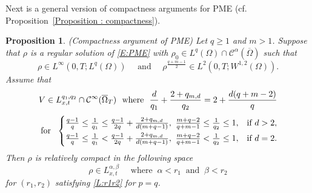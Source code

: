 \documentclass{amsart}
\newtheorem{proposition}[defn]{Proposition}
\numberwithin{equation}{section}
\newcommand{\calC}{{ \mathcal C  }}
\begin{document}
%
Next is a general version of compactness arguments for PME (cf. Proposition~\ref{Proposition : compactness}).
\begin{proposition}\label{P:AL:PME} (Compactness argument of PME)
 Let $q\geq 1$ and $m>1$.
Suppose that $\rho$ is a regular solution of \eqref{E:PME} with $\rho_{0}\in  L^{q}(\Omega) \cap \calC^{\alpha}(\overline{\Omega})$ such that 
\begin{equation*}\label{FS01:PME}
\rho \in L^{\infty} \left(0, T; L^q (\Omega)\right) \quad \text{ and } \quad 
\rho^{\frac{q+m-1}{2}} \in L^2 \left(0, T; W^{1,2}(\Omega)\right).
\end{equation*}
Assume that 
\begin{equation}\label{V:compact:PME}
\begin{gathered}
	V \in L_{x,t}^{q_1, q_2}\cap \calC^{\infty} (\overline{\Omega}_{T})
	\ \text{ where } \  \frac{d}{q_1} + \frac{2 + q_{m,d}}{q_2} = 2+\frac{d(q+m-2)}{q} \vspace{1 mm}\\
	\text{ for } \ 
	\begin{cases}
		\frac{q-1}{q}\leq \frac{1}{q_1} \leq \frac{q-1}{2q} + \frac{2+q_{m,d}}{d(m+q-1)}, \ \frac{m+q-2}{q+m-1} \leq \frac{1}{q_2} \leq 1, & \text{if } d > 2, \vspace{1 mm}\\
		\frac{q-1}{q} \leq \frac{1}{q_1} < \frac{q-1}{2q} + \frac{2+q_{m,d}}{d(m+q-1)}, \ \frac{m+q-2}{q+m-1} < \frac{1}{q_2} \leq 1, & \text{if } d = 2.
	\end{cases} 
\end{gathered} 
\end{equation}
Then $\rho$ is relatively compact in the following space
\begin{equation*}\label{compact:PME}
\rho \in L^{\alpha, \beta}_{x,t} \quad \text{ where } \ \alpha < r_1 \ \text{ and } \ \beta <r_2 
\end{equation*}
for $(r_1, r_2)$ satisfying \eqref{L:r1r2} for $p=q$. 
\end{proposition}
\end{document}
